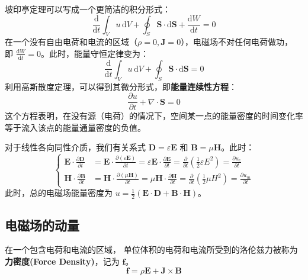 \documentclass[fontset=none]{ctexart}
\begin{document}
坡印亭定理可以写成一个更简洁的积分形式：
\begin{equation}
    \frac{\mathrm{d}}{\mathrm{d}t}\int_V u \, \mathrm{d}V 
    + \oint_S \bm{S} \cdot \mathrm{d}\bm{S} + \frac{\mathrm{d}W}{\mathrm{d}t} = 0
\end{equation}
在一个没有自由电荷和电流的区域（$\rho=0, \bm{J}=0$），电磁场不对任何电荷做功，
即 $\frac{\mathrm{d}W}{\mathrm{d}t} = 0$。此时，能量守恒定律变为：
\begin{equation}
    \frac{\mathrm{d}}{\mathrm{d}t}\int_V u \, \mathrm{d}V + \oint_S \bm{S} \cdot \mathrm{d}\bm{S} = 0
\end{equation}
利用高斯散度定理，可以得到其微分形式，即\textbf{能量连续性方程}：
\begin{equation}
    \frac{\partial u}{\partial t} + \nabla \cdot \bm{S} = 0
\end{equation}
这个方程表明，在没有源（电荷）的情况下，空间某一点的能量密度的时间变化率等于流入该点的能量通量密度的负值。

对于线性各向同性介质，我们有关系式 $\bm{D} = \varepsilon \bm{E}$ 和 $\bm{B} = \mu \bm{H}$。此时：
\begin{equation}
    \left\{
    \begin{aligned}
    \bm{E} \cdot \frac{\partial \bm{D}}{\partial t} 
    &= \bm{E} \cdot \frac{\partial (\varepsilon \bm{E})}{\partial t} 
    = \varepsilon \bm{E} \cdot \frac{\partial \bm{E}}{\partial t} 
    = \frac{\partial}{\partial t}\left(\frac{1}{2}\varepsilon E^2\right) 
    = \frac{\partial u_e}{\partial t} \\
    \bm{H} \cdot \frac{\partial \bm{B}}{\partial t} 
    &= \bm{H} \cdot \frac{\partial (\mu \bm{H})}{\partial t} 
    = \mu \bm{H} \cdot \frac{\partial \bm{H}}{\partial t} 
    = \frac{\partial}{\partial t}\left(\frac{1}{2}\mu H^2\right) 
    = \frac{\partial u_m}{\partial t}
    \end{aligned}
    \right.
\end{equation}
此时，总的电磁场能量密度为 $u = \frac{1}{2}(\bm{E}\cdot\bm{D} + \bm{B}\cdot\bm{H})$。

\subsection{电磁场的动量}

\begin{definition}[电磁场力密度]
在一个包含电荷和电流的区域，
单位体积的电荷和电流所受到的洛伦兹力被称为\textbf{力密度(Force Density)}，记为 $\bm{f}$。
\begin{equation}
    \bm{f} = \rho \bm{E} + \bm{J} \times \bm{B}
\end{equation}
\end{definition}
\end{document}

